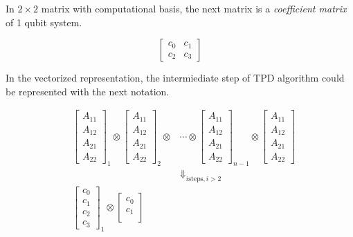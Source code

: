 \documentclass[twocolumn]{article}
\begin{document}
In $2 \times 2$ matrix with computational basis, the next matrix is a \textit{coefficient matrix} of 1 qubit system.

\begin{equation}
    \begin{bmatrix}
        c_0 & c_1\\
        c_2 & c_3
    \end{bmatrix}
\end{equation}

In the vectorized representation, the intermiediate step of TPD algorithm 
could be represented with the next notation. 

\begin{eqnarray}
    &\begin{bmatrix}
        A_{11} \\
        A_{12} \\
        A_{21} \\
        A_{22}
    \end{bmatrix}_1 \otimes
    \begin{bmatrix}
        A_{11} \\
        A_{12} \\
        A_{21} \\
        A_{22}
    \end{bmatrix}_2 \otimes
    &\cdots \otimes
    \begin{bmatrix}
        A_{11} \\
        A_{12} \\
        A_{21} \\
        A_{22}
    \end{bmatrix}_{n-1} \otimes
    \begin{bmatrix}
        A_{11} \\
        A_{12} \\
        A_{21} \\
        A_{22}
    \end{bmatrix}
    \nonumber\\
    & &\Downarrow_{i \text{steps}, i>2} \label{eq:vec_tpd}\\
    &\begin{bmatrix}
        c_0\\
        c_1\\
        c_2\\
        c_3
    \end{bmatrix}_1 \otimes
    \begin{bmatrix}
        c_0\\
        c_1\\

\end{bmatrix}
\end{eqnarray}
\end{document}
